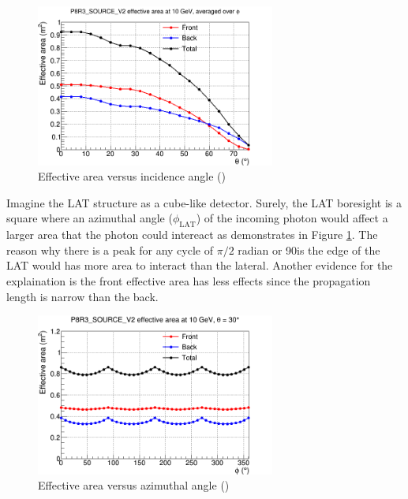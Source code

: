\begin{figure}[h]
    \centering
    \includegraphics[width=0.7\textwidth]{content/background/figures/eff_theta.png}
    \caption{Effective area versus incidence angle (\cite{lat_p8_performance})}
    \label{fig:eff_theta}
\end{figure}

Imagine the LAT structure as a cube-like detector. Surely, the LAT 
boresight is a square where an azimuthal angle ($\phi_\text{LAT}$) of the incoming 
photon would affect a larger area that the photon could intereact 
as demonstrates in Figure \ref{fig:eff_theta}. The reason why there 
is a peak for any cycle of $\pi/2$ radian or 90\textdegree is 
the edge of the LAT would has more area to interact than the 
lateral. Another evidence for the explaination is the front effective 
area has less effects since the propagation length is narrow than 
the back.

\begin{figure}[h]
    \centering
    \includegraphics[width=0.7\textwidth]{content/background/figures/eff_phi.png}
    \caption{Effective area versus azimuthal angle (\cite{lat_p8_performance})}
    \label{fig:eff_phi}
\end{figure}

